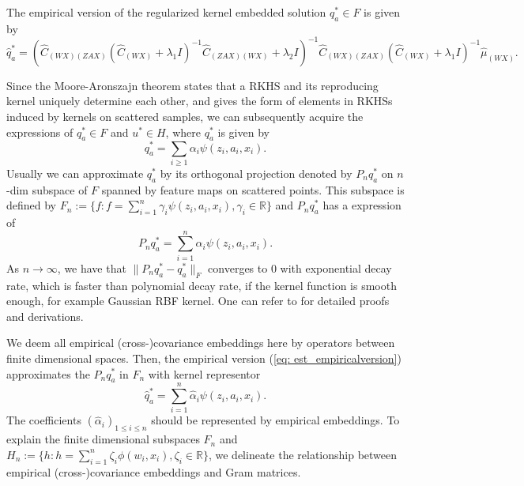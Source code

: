 The empirical version of the regularized kernel embedded solution $q_a^*\in F$ is given by
\begin{equation}
    \label{eq: est_empiricalversion}
    \widehat{q}_a^*=(\widehat{C}_{(WX)(ZAX)}(\widehat{C}_{(WX)}+\lambda_1I)^{-1}\widehat{C}_{(ZAX)(WX)}+\lambda_2I)^{-1}\widehat{C}_{(WX)(ZAX)}(\widehat{C}_{(WX)}+\lambda_1I)^{-1}\widehat{\mu}_{(WX)}. 
\end{equation}

Since the Moore-Aronszajn theorem states that a RKHS and its reproducing kernel uniquely determine each other,
and gives the form of elements in RKHSs induced by kernels on scattered samples, 
we can subsequently acquire the expressions of $q_a^*\in F$ and $u^*\in H$, where $q_a^*$ is given by
\begin{equation*}
    q_a^* = \sum_{i\geq 1}\alpha_i\psi(z_i,a_i,x_i). 
\end{equation*}
Usually we can approximate $q_a^*$ by its orthogonal projection denoted by $P_nq^*_a$ on $n$-dim subspace of $F$ spanned by feature maps on scattered points. 
This subspace is defined by $F_n:=\{f:f=\sum_{i=1}^{n}\gamma_i\psi(z_i,a_i,x_i),\gamma_i\in\mathbb{R}\}$ and $P_nq^*_a$ has a expression of 
\begin{equation}
    \label{eq: est_projectedkernelrepresentor}
    P_nq^*_a = \sum_{i=1}^{n}\alpha_i\psi(z_i,a_i,x_i).
\end{equation}
As $n\rightarrow\infty$, we have that $\|P_nq^*_a-q^*_a\|_F$ converges to 0 with exponential decay rate, 
which is faster than polynomial decay rate, if the kernel function is smooth enough, for example Gaussian RBF kernel. 
One can refer to \cite{Buhmann2003Radial,Wendland2004scattered} for detailed proofs and derivations.

We deem all empirical (cross-)covariance embeddings here by operators between finite dimensional spaces.
Then, the empirical version (\ref{eq: est_empiricalversion}) approximates the $P_nq^*_a$ in $F_n$  
with kernel representor 
\begin{equation}
    \label{eq: est_kernelrepresentorsimple}
    \widehat{q}_a^* = \sum_{i=1}^{n}\widehat{\alpha}_i\psi(z_i,a_i,x_i). 
\end{equation}
The coefficients $(\widehat{\alpha}_i)_{1\leq i\leq n}$ should be represented by empirical embeddings. 
To explain the finite dimensional subspaces $F_n$ and $H_n:=\{h:h=\sum_{i=1}^n\zeta_i\phi(w_i,x_i),\zeta_i\in\mathbb{R}\}$, 
we delineate the relationship between empirical (cross-)covariance embeddings and Gram matrices. 

